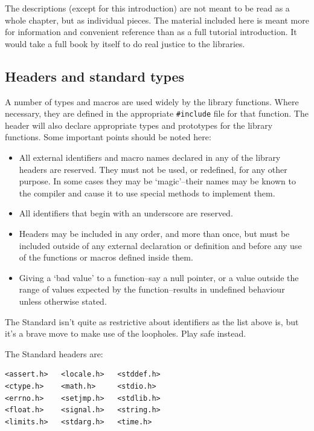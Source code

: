   The descriptions (except for this introduction) are not
   meant to be read as a whole chapter, but as individual
   pieces.  The material included here is meant more for
   information and convenient reference than as a full tutorial
   introduction.  It would take a full book by itself to do
   real justice to the libraries.


  \subsection{Headers and standard types}
   

   A number of types and macros are used widely by the library
    functions.  Where necessary, they are defined in the
    appropriate \texttt{\#include} file for that function.  The header
    will also declare appropriate types and prototypes for the
    library functions.  Some important points should be noted
    here:


   \begin{itemize}
    \item All external identifiers and macro names declared in any
     of the library headers are reserved.  They must not be
     used, or redefined, for any other purpose.  In some cases
     they may be `magic'--their names may be known to the
     compiler and cause it to use special methods to implement
     them.

    \item All identifiers that begin with an underscore are
     reserved.

    \item Headers may be included in any order, and more than once,
     but must be included outside of any external declaration
     or definition and before any use of the functions or
     macros defined inside them.

    \item Giving a `bad value' to a function--say a null pointer,
     or a value outside the range of values expected by the
     function--results in undefined behaviour unless
     otherwise stated.
   \end{itemize}

   The Standard isn't quite as restrictive about identifiers as
    the list above is, but it's a brave move to make use of the
    loopholes.  Play safe instead.


   The Standard headers are:


   \begin{Verbatim}
<assert.h>   <locale.h>   <stddef.h>
<ctype.h>    <math.h>     <stdio.h>
<errno.h>    <setjmp.h>   <stdlib.h>
<float.h>    <signal.h>   <string.h>
<limits.h>   <stdarg.h>   <time.h>
\end{Verbatim}

